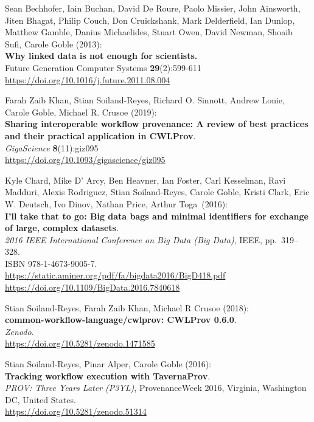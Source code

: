 \documentclass[10pt,letterpaper]{article}
\begin{document}
\begin{thebibliography}{10}
\begin{small}
Sean Bechhofer, Iain Buchan, David De Roure, Paolo
Missier, John Ainsworth, Jiten Bhagat, Philip Couch, Don Cruickshank,
Mark Delderfield, Ian Dunlop, Matthew Gamble, Danius Michaelides, Stuart
Owen, David Newman, Shoaib Sufi, Carole Goble (2013):\\
\textbf{Why linked data is not enough for scientists.}\\
Future Generation Computer Systems \textbf{29}(2):599-611\\
\url{https://doi.org/10.1016/j.future.2011.08.004}


 Farah Zaib Khan, Stian Soiland-Reyes, Richard O.
Sinnott, Andrew Lonie, Carole Goble, Michael R. Crusoe (2019):\\
\textbf{Sharing interoperable workflow provenance: A review of best
practices and their practical application in CWLProv}.\\
\emph{GigaScience} \textbf{8}(11):giz095\\
\url{https://doi.org/10.1093/gigascience/giz095}

Kyle Chard, Mike D' Arcy, Ben Heavner, Ian Foster, Carl
Kesselman, Ravi Madduri, Alexis Rodriguez, Stian Soiland-Reyes, Carole
Goble, Kristi Clark, Eric W. Deutsch, Ivo Dinov, Nathan Price, Arthur
Toga~(2016):\\
\textbf{I'll take that to go: Big data bags and minimal identifiers for
exchange of large, complex datasets}.\\
\emph{2016 IEEE International Conference on Big Data (Big Data)}, IEEE,
pp.~319--328.\\
ISBN 978-1-4673-9005-7.\\
\url{https://static.aminer.org/pdf/fa/bigdata2016/BigD418.pdf}\\
\url{https://doi.org/10.1109/BigData.2016.7840618}

Stian Soiland-Reyes, Farah Zaib Khan, Michael R Crusoe (2018):\\
\textbf{common-workflow-language/cwlprov: CWLProv 0.6.0}.\\
\emph{Zenodo}.\\
\url{https://doi.org/10.5281/zenodo.1471585}

Stian Soiland-Reyes, Pinar Alper, Carole Goble (2016):\\
\textbf{Tracking workflow execution with TavernaProv}.\\
\emph{PROV: Three Years Later (P3YL)}, ProvenanceWeek 2016, Virginia, Washington DC, United States. \\
\url{https://doi.org/10.5281/zenodo.51314}


\end{small}
\end{thebibliography}
\end{document}
